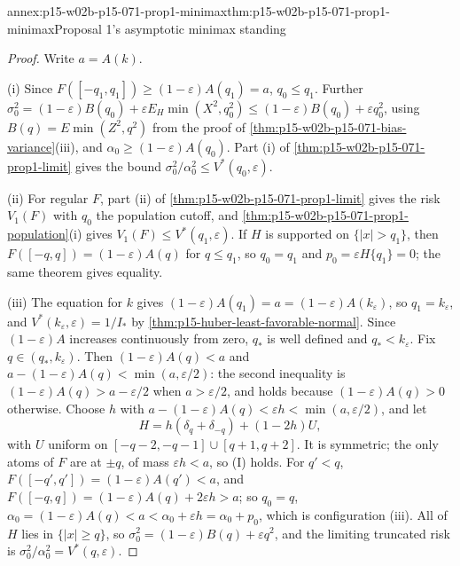\begin{annexitem}{annex:p15-w02b-p15-071-prop1-minimax}{thm:p15-w02b-p15-071-prop1-minimax}{Proposal 1's asymptotic minimax standing}
\begin{proof}
Write \(a=A(k)\).

(i) Since \(F([-q_1,q_1])\geq(1-\varepsilon)A(q_1)=a\), \(q_0\leq q_1\).
Further \(\sigma_0^2=(1-\varepsilon)B(q_0)+\varepsilon E_H\min(X^2,q_0^2)
\leq(1-\varepsilon)B(q_0)+\varepsilon q_0^2\), using
\(B(q)=E\min(Z^2,q^2)\) from the proof of
\cref{thm:p15-w02b-p15-071-bias-variance}(iii), and
\(\alpha_0\geq(1-\varepsilon)A(q_0)\). Part (i) of
\cref{thm:p15-w02b-p15-071-prop1-limit} gives the bound
\(\sigma_0^2/\alpha_0^2\leq V^*(q_0,\varepsilon)\).

(ii) For regular \(F\), part (ii) of
\cref{thm:p15-w02b-p15-071-prop1-limit} gives the risk \(V_1(F)\) with
\(q_0\) the population cutoff, and
\cref{thm:p15-w02b-p15-071-prop1-population}(i) gives
\(V_1(F)\leq V^*(q_1,\varepsilon)\). If \(H\) is supported on
\(\{|x|>q_1\}\), then \(F([-q,q])=(1-\varepsilon)A(q)\) for
\(q\leq q_1\), so \(q_0=q_1\) and \(p_0=\varepsilon H\{q_1\}=0\); the
same theorem gives equality.

(iii) The equation for \(k\) gives \((1-\varepsilon)A(q_1)=a=
(1-\varepsilon)A(k_\varepsilon)\), so \(q_1=k_\varepsilon\), and
\(V^*(k_\varepsilon,\varepsilon)=1/I_*\) by
\cref{thm:p15-huber-least-favorable-normal}.
Since \((1-\varepsilon)A\) increases continuously from zero, \(q_*\)
is well defined and \(q_*<k_\varepsilon\). Fix
\(q\in(q_*,k_\varepsilon)\). Then \((1-\varepsilon)A(q)<a\) and
\(a-(1-\varepsilon)A(q)<\min(a,\varepsilon/2)\): the second inequality
is \((1-\varepsilon)A(q)>a-\varepsilon/2\) when \(a>\varepsilon/2\),
and holds because \((1-\varepsilon)A(q)>0\) otherwise. Choose \(h\) with
\(a-(1-\varepsilon)A(q)<\varepsilon h<\min(a,\varepsilon/2)\), and let
\[
 H=h(\delta_q+\delta_{-q})+(1-2h)U,
\]
with \(U\) uniform on \([-q-2,-q-1]\cup[q+1,q+2]\). It is symmetric;
the only atoms of \(F\) are at \(\pm q\), of mass \(\varepsilon h<a\),
so (I) holds. For \(q'<q\), \(F([-q',q'])=(1-\varepsilon)A(q')<a\), and
\(F([-q,q])=(1-\varepsilon)A(q)+2\varepsilon h>a\); so \(q_0=q\),
\(\alpha_0=(1-\varepsilon)A(q)<a<\alpha_0+\varepsilon h=\alpha_0+p_0\),
which is configuration (iii). All of \(H\) lies in \(\{|x|\geq q\}\),
so \(\sigma_0^2=(1-\varepsilon)B(q)+\varepsilon q^2\), and the limiting
truncated risk is \(\sigma_0^2/\alpha_0^2=V^*(q,\varepsilon)\).


\end{proof}
\end{annexitem}

